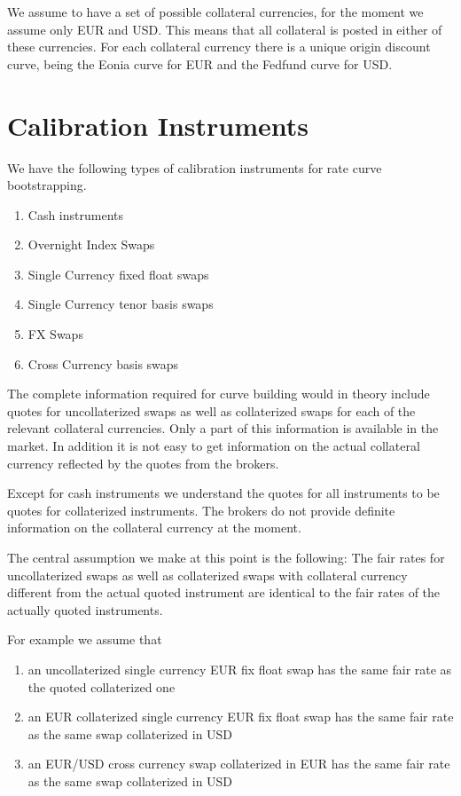 \documentclass{amsart}
\theoremstyle{plain}
\numberwithin{equation}{section}
\begin{document}
We assume to have a set of possible collateral currencies, for the moment we assume only EUR and USD. This means that all collateral is posted in either of these currencies. For each collateral currency there is a unique origin discount curve, being the Eonia curve for EUR and the Fedfund curve for USD.

\section{Calibration Instruments}

We have the following types of calibration instruments for rate curve bootstrapping.

\begin{enumerate}
\item Cash instruments
\item Overnight Index Swaps
\item Single Currency fixed float swaps
\item Single Currency tenor basis swaps
\item FX Swaps
\item Cross Currency basis swaps
\end{enumerate}

The complete information required for curve building would in theory include quotes for uncollaterized swaps as well as collaterized swaps for each of the relevant collateral currencies. Only a part of this information is available in the market. In addition it is not easy to get information on the actual collateral currency reflected by the quotes from the brokers.

Except for cash instruments we understand the quotes for all instruments to be quotes for collaterized instruments. The brokers do not provide definite information on the collateral currency at the moment.

The central assumption we make at this point is the following: The fair rates for uncollaterized swaps as well as collaterized swaps with collateral currency different from the actual quoted instrument are identical to the fair rates of the actually quoted instruments.

For example we assume that

\begin{enumerate}
\item an uncollaterized single currency EUR fix float swap has the same fair rate as the quoted collaterized one
\item an EUR collaterized single currency EUR fix float swap has the same fair rate as the same swap collaterized in USD
\item an EUR/USD cross currency swap collaterized in EUR has the same fair rate as the same swap collaterized in USD
\end{enumerate}
\end{document}
